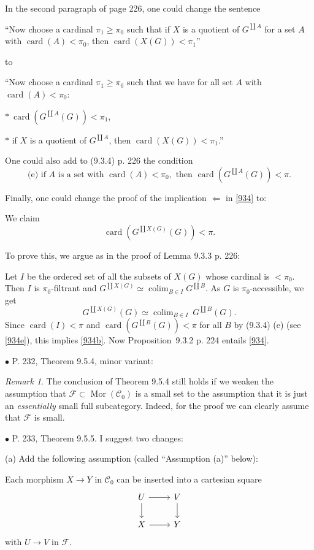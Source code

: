\documentclass[12pt]{article}
\theoremstyle{remark}%
\newtheorem{rk}[thm]{Remark}
\newcommand{\bu}{\bullet}
\newcommand{\n}{\noindent}
\newcommand{\cc}{\mathcal}
\newcommand{\C}{\mathcal C}
\newcommand{\be}{\begin{equation}}
\newcommand{\ee}{\end{equation}}
\DeclareMathOperator*{\co}{colim}
\DeclareMathOperator{\ca}{card}
\DeclareMathOperator{\Mor}{Mor}
\begin{document}
In the second paragraph of page 226, one could change the sentence 

``Now choose a cardinal $\pi_1\ge\pi_0$ such that if $X$ is a quotient of $G^{\coprod A}$ for a set $A$ with $\ca(A)<\pi_0$, then $\ca(X(G))<\pi_1$''

\n to 

``Now choose a cardinal $\pi_1\ge\pi_0$ such that we have for all set $A$ with $\ca(A)<\pi_0$: 

$*\ \ca(G^{\coprod A}(G))<\pi_1$, 

$*$ if $X$ is a quotient of $G^{\coprod A}$, then $\ca(X(G))<\pi_1$.'' 

One could also add to (9.3.4) p. 226 the condition 
\be\label{934e}
\text{(e) if }A\text{ is a set with }\ca(A)<\pi_0,\text{ then }\ca(G^{\coprod A}(G))<\pi.
\ee

Finally, one could change the proof of the implication $\Leftarrow$ in \eqref{934} to: 

We claim  
\be\label{934b}
\ca(G^{\coprod X(G)}(G))<\pi.
\ee 

To prove this, we argue as in the proof of Lemma 9.3.3 p. 226: 

Let $I$ be the ordered set of all the subsets of $X(G)$ whose cardinal is $<\pi_0$. Then $I$ is $\pi_0$-filtrant and $G^{\coprod X(G)}\simeq\co_{B\in I}G^{\coprod B}$. As $G$ is $\pi_0$-accessible, we get 
$$
G^{\coprod X(G)}(G)\simeq\co_{B\in I}\ G^{\coprod B}(G).
$$ 
Since $\ca(I)<\pi$ and $\ca(G^{\coprod B}(G))<\pi$ for all $B$ by (9.3.4) (e) (see \eqref{934e}), this implies \eqref{934b}. Now Proposition~9.3.2 p. 224 entails \eqref{934}. 


\n$\bu$ P. 232, Theorem 9.5.4, minor variant: 
\begin{rk}\label{954}
The conclusion of Theorem 9.5.4 still holds if we weaken the assumption that $\cc F\subset\Mor(\C_0)$ is a small set to the assumption that it is just an {\em essentially} small full subcategory. Indeed, for the proof we can clearly assume that $\cc F$ is small. 
\end{rk}


\n$\bu$ P. 233, Theorem 9.5.5. I suggest two changes: 

\n(a) Add the following assumption (called ``Assumption (a)'' below): 

Each morphism $X\to Y$ in $\C_0$ can be inserted into a cartesian square
$$
\begin{tikzcd}
U\ar{r}\ar{d}&V\ar{d}\\ X\ar{r}&Y
\end{tikzcd}
$$ 
with $U\to V$ in $\cc F$. 
\end{document}
